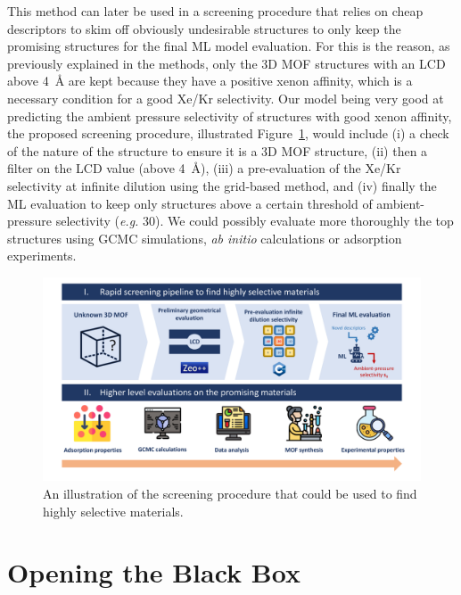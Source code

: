 \documentclass[main]{subfiles}
\begin{document}
This method can later be used in a screening procedure that relies on cheap descriptors to skim off obviously undesirable structures to only keep the promising structures for the final ML model evaluation. For this is the reason, as previously explained in the methods, only the 3D MOF structures with an LCD above \SI{4}{\angstrom} are kept because they have a positive xenon affinity, which is a necessary condition for a good Xe/Kr selectivity. Our model being very good at predicting the ambient pressure selectivity of structures with good xenon affinity, the proposed screening procedure, illustrated Figure~\ref{fgr:pipeline}, would include (i) a check of the nature of the structure to ensure it is a 3D MOF structure, (ii) then a filter on the LCD value (above \SI{4}{\angstrom}), (iii) a pre-evaluation of the Xe/Kr selectivity at infinite dilution using the grid-based method, and (iv) finally the ML evaluation to keep only structures above a certain threshold of ambient-pressure selectivity (\emph{e.g.} 30). We could possibly evaluate more thoroughly the top structures using GCMC simulations, \emph{ab initio} calculations or adsorption experiments.

\begin{figure}[ht]
\centering
  \includegraphics[width=0.99\linewidth]{figures/4-ml/main/pipeline.pdf}
  \caption{An illustration of the screening procedure that could be used to find highly selective materials.}\label{fgr:pipeline}
\end{figure}

\section{Opening the Black Box}
\end{document}
